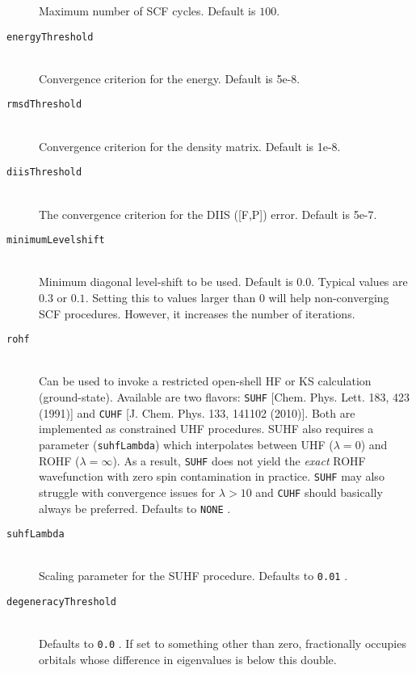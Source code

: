 \documentclass[bibliography=totocnumbered,a4paper,10pt,oneside]{scrbook}
\newcommand{\ttt}[1]{%
  \begingroup\setlength{\fboxsep}{1pt}%
  \colorbox{serenity-green!30}{\texttt{\hspace*{2pt}\vphantom{(g}#1\hspace*{2pt}}}%
  \endgroup
}
\begin{document}
\begin{description}
   Maximum number of SCF cycles. Default is $100$.
   \item [\texttt{energyThreshold}]\hfill \\
   Convergence criterion for the energy. Default is 5e-8.
   \item [\texttt{rmsdThreshold}]\hfill \\
   Convergence criterion for the density matrix. Default is 1e-8.
  \item [\texttt{diisThreshold}]\hfill \\
   The convergence criterion for the DIIS ([F,P]) error. Default is 5e-7.
   \item [\texttt{minimumLevelshift}]\hfill \\
   Minimum diagonal level-shift to be used. Default is $0.0$. Typical values are $0.3$ or $0.1$. Setting this to values larger than $0$ will
   help non-converging SCF procedures. However, it increases the number of iterations.
   \item [\texttt{rohf}]\hfill \\
   Can be used to invoke a restricted open-shell HF or KS calculation (ground-state). 
   Available are two flavors: \ttt{SUHF} [Chem. Phys. Lett. 183, 423 (1991)] and \ttt{CUHF} [J. Chem. Phys. 133, 141102 (2010)].
   Both are implemented as constrained UHF procedures. SUHF also requires a parameter (\texttt{suhfLambda}) which interpolates between
   UHF ($\lambda = 0$) and ROHF ($\lambda = \infty$). As a result, \ttt{SUHF} does not yield the \textit{exact} ROHF wavefunction with
   zero spin contamination in practice. \ttt{SUHF} may also struggle with convergence issues for $\lambda > 10$ and \ttt{CUHF} should
   basically always be preferred. Defaults to \ttt{NONE}.
   \item [\texttt{suhfLambda}]\hfill\\
   Scaling parameter for the SUHF procedure. Defaults to \ttt{0.01}.
   \item [\texttt{degeneracyThreshold}]\hfill\\
   Defaults to \ttt{0.0}. If set to something other than zero, fractionally occupies orbitals whose difference in eigenvalues is below this double.
\end{description}
\end{document}
